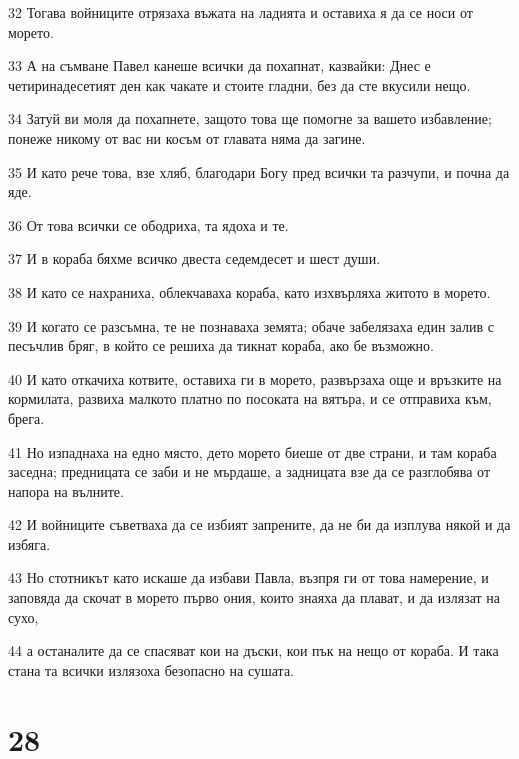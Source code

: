 \par 32 Тогава войниците отрязаха въжата на ладията и оставиха я да се носи от морето.
\par 33 А на съмване Павел канеше всички да похапнат, казвайки: Днес е четиринадесетият ден как чакате и стоите гладни, без да сте вкусили нещо.
\par 34 Затуй ви моля да похапнете, защото това ще помогне за вашето избавление; понеже никому от вас ни косъм от главата няма да загине.
\par 35 И като рече това, взе хляб, благодари Богу пред всички та разчупи, и почна да яде.
\par 36 От това всички се ободриха, та ядоха и те.
\par 37 И в кораба бяхме всичко двеста седемдесет и шест души.
\par 38 И като се нахраниха, облекчаваха кораба, като изхвърляха житото в морето.
\par 39 И когато се разсъмна, те не познаваха земята; обаче забелязаха един залив с песъчлив бряг, в който се решиха да тикнат кораба, ако бе възможно.
\par 40 И като откачиха котвите, оставиха ги в морето, развързаха още и връзките на кормилата, развиха малкото платно по посоката на вятъра, и се отправиха към, брега.
\par 41 Но изпаднаха на едно място, дето морето биеше от две страни, и там кораба заседна; предницата се заби и не мърдаше, а задницата взе да се разглобява от напора на вълните.
\par 42 И войниците съветваха да се избият запрените, да не би да изплува някой и да избяга.
\par 43 Но стотникът като искаше да избави Павла, възпря ги от това намерение, и заповяда да скочат в морето първо ония, които знаяха да плават, и да излязат на сухо,
\par 44 а останалите да се спасяват кои на дъски, кои пък на нещо от кораба. И така стана та всички излязоха безопасно на сушата.

\chapter{28}

